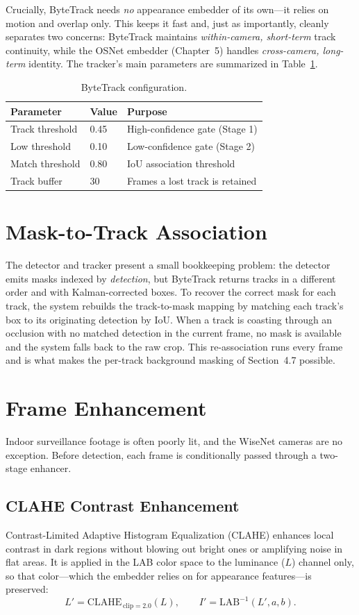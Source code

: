 \documentclass[12pt]{report}
\begin{document}
Crucially, ByteTrack needs \emph{no} appearance embedder of its own---it relies on motion and overlap only. This keeps it fast and, just as importantly, cleanly separates two concerns: ByteTrack maintains \emph{within-camera, short-term} track continuity, while the OSNet embedder (Chapter~5) handles \emph{cross-camera, long-term} identity. The tracker's main parameters are summarized in Table~\ref{tab:bytetrack_params}.

\begin{table}[H]
\centering
\begin{tabular}{|l|l|l|}
\hline
\textbf{Parameter} & \textbf{Value} & \textbf{Purpose} \\
\hline
Track threshold & 0.45 & High-confidence gate (Stage 1) \\
\hline
Low threshold & 0.10 & Low-confidence gate (Stage 2) \\
\hline
Match threshold & 0.80 & IoU association threshold \\
\hline
Track buffer & 30 & Frames a lost track is retained \\
\hline
\end{tabular}
\caption{ByteTrack configuration.}
\label{tab:bytetrack_params}
\end{table}

\section{Mask-to-Track Association}
The detector and tracker present a small bookkeeping problem: the detector emits masks indexed by \emph{detection}, but ByteTrack returns tracks in a different order and with Kalman-corrected boxes. To recover the correct mask for each track, the system rebuilds the track-to-mask mapping by matching each track's box to its originating detection by IoU. When a track is coasting through an occlusion with no matched detection in the current frame, no mask is available and the system falls back to the raw crop. This re-association runs every frame and is what makes the per-track background masking of Section~4.7 possible.

\section{Frame Enhancement}
Indoor surveillance footage is often poorly lit, and the WiseNet cameras are no exception. Before detection, each frame is conditionally passed through a two-stage enhancer.

\subsection{CLAHE Contrast Enhancement}
Contrast-Limited Adaptive Histogram Equalization (CLAHE) enhances local contrast in dark regions without blowing out bright ones or amplifying noise in flat areas. It is applied in the LAB color space to the luminance ($L$) channel only, so that color---which the embedder relies on for appearance features---is preserved:
\[
L' = \text{CLAHE}_{\,\text{clip}=2.0}(L), \qquad I' = \text{LAB}^{-1}(L', a, b).
\]
\end{document}
